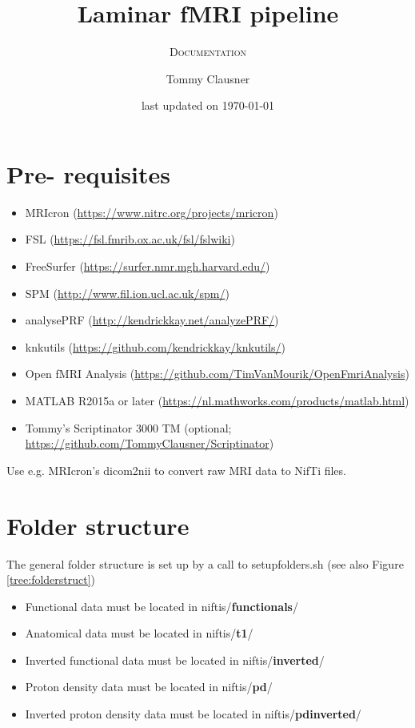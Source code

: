 \documentclass[12pt,a4paper]{scrartcl}
\title{Laminar fMRI pipeline}
\author{Tommy Clausner}
\subtitle{\textsc{Documentation}}
\date{\small{last updated on \today}}
\begin{document}
\begin{titlepage}
\clearpage\maketitle
\thispagestyle{empty}
\end{titlepage}
\tableofcontents
\newpage
\listoffigures
\newpage
\listoftables
\newpage
\section{Pre- requisites}
\begin{itemize}
\item MRIcron (\href{https://www.nitrc.org/projects/mricron}{https://www.nitrc.org/projects/mricron})
\item FSL (\href{https://fsl.fmrib.ox.ac.uk/fsl/fslwiki}{https://fsl.fmrib.ox.ac.uk/fsl/fslwiki})
\item FreeSurfer (\href{https://surfer.nmr.mgh.harvard.edu/}{https://surfer.nmr.mgh.harvard.edu/})
\item SPM (\href{http://www.fil.ion.ucl.ac.uk/spm/}{http://www.fil.ion.ucl.ac.uk/spm/})
\item analysePRF (\href{http://kendrickkay.net/analyzePRF/}{http://kendrickkay.net/analyzePRF/})
\item knkutils (\href {https://github.com/kendrickkay/knkutils/}{https://github.com/kendrickkay/knkutils/})
\item Open fMRI Analysis (\href{https://github.com/TimVanMourik/OpenFmriAnalysis}{https://github.com/TimVanMourik/OpenFmriAnalysis})
\item MATLAB R2015a or later (\href{https://nl.mathworks.com/products/matlab.html}{https://nl.mathworks.com/products/matlab.html})
\item Tommy's Scriptinator 3000 TM (optional; \href{https://github.com/TommyClausner/Scriptinator}{https://github.com/TommyClausner/Scriptinator})
\end{itemize}

Use e.g. MRIcron's dicom2nii to convert raw MRI data to NifTi files.\\

\section{Folder structure}
The general folder structure is set up by a call to setupfolders.sh (see also Figure \ref{tree:folderstruct})
\begin{itemize}
\item Functional data must be located in niftis/\textbf{functionals}/
\item Anatomical data must be located in niftis/\textbf{t1}/
\item Inverted functional data must be located in niftis/\textbf{inverted}/
\item Proton density data must be located in niftis/\textbf{pd}/
\item Inverted proton density data must be located in niftis/\textbf{pdinverted}/
\end{itemize}
\end{document}
